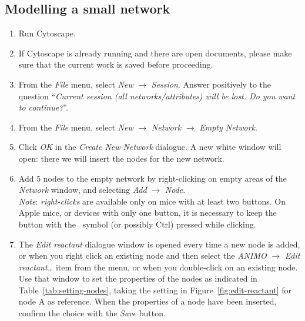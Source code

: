 \documentclass{article}
\newcommand{\maccmd}{\raisebox{-0.35ex}{\pgfuseimage{mac-command}}}
\begin{document}
\subsection{Modelling a small network}\label{sec:modeling-network-example}
\begin{enumerate}
\item Run Cytoscape.
\item If Cytoscape is already running and there are open documents, please make sure that the current work is saved before proceeding.
\item From the \emph{File} menu, select \emph{New} $\rightarrow$ \emph{Session}. Answer positively to the question
``\emph{Current session (all networks/attributes) will be lost. Do you want to continue?}''.
\item From the \emph{File} menu, select \emph{New} $\rightarrow$ \emph{Network} $\rightarrow$ \emph{Empty Network}.
\item Click \emph{OK} in the \emph{Create New Network} dialogue. A new white window will open: there we will insert the nodes for the new network.
\item\label{step:add-nodes} Add $5$ nodes to the empty network by right-clicking
on empty areas of the \emph{Network} window, and selecting \emph{Add} $\rightarrow$ \emph{Node}.\\
\emph{Note}: \emph{right-clicks} are available only on mice with at least two buttons. On Apple mice,
or devices with only one button, it is necessary to keep the button with the \maccmd\ symbol (or possibly Ctrl) pressed while clicking.
\item The \emph{Edit reactant} dialogue window is opened every time a new node is added,
or when you right click an existing node and then select the \emph{ANIMO} $\rightarrow$ \emph{Edit reactant\dots}
item from the menu, or when you double-click on an existing node.
Use that window to set the properties of the nodes as indicated in Table~\ref{tab:setting-nodes},
taking the setting in Figure~\ref{fig:edit-reactant} for node A as reference. When
the properties of a node have been inserted, confirm the choice with the \emph{Save} button.
\setcounter{miocounterperenumerate}{\value{enumi}}
\end{enumerate}\vspace{-2ex}
\end{document}
